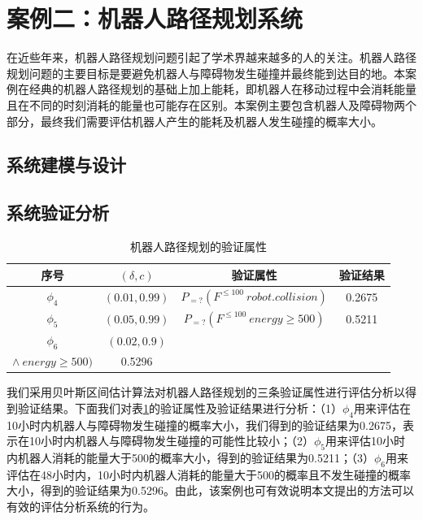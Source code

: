 \section{案例二：机器人路径规划系统}
在近些年来，机器人路径规划问题引起了学术界越来越多的人的关注。机器人路径规划问题的主要目标是要避免机器人与障碍物发生碰撞并最终能到达目的地。本案例在经典的机器人路径规划的基础上加上能耗，即机器人在移动过程中会消耗能量且在不同的时刻消耗的能量也可能存在区别。本案例主要包含机器人及障碍物两个部分，最终我们需要评估机器人产生的能耗及机器人发生碰撞的概率大小。
\subsection{系统建模与设计}

\subsection{系统验证分析}
\begin{table}[t]
	\caption{机器人路径规划的验证属性}
	\label{tb:robot}
	\centering
	\begin{tabular}{c c c c}
		\hline
		序号 & $(\delta,c)$ & 验证属性 & 验证结果 \\
		\hline
		$\phi_4$ & $(0.01,0.99)$ & $P_{=?}(F^{\leq100}~robot.collision)$ & 0.2675 \\ 
		$\phi_5$ & $(0.05,0.99)$ & $P_{=?}(F^{\leq100}~energy \geq 500)$ & 0.5211 \\
		$\phi_6$ & $(0.02,0.9)$ & 
		\tabincell{c}{$P_{=?}(F^{\leq100}~robot.collision$ \\ $\wedge~energy \geq 500)$} & 0.5296\\
		\hline
	\end{tabular}
\end{table}

我们采用贝叶斯区间估计算法对机器人路径规划的三条验证属性进行评估分析以得到验证结果。下面我们对表\ref{tb:robot}的验证属性及验证结果进行分析：（1）$\phi_4$用来评估在10小时内机器人与障碍物发生碰撞的概率大小，我们得到的验证结果为0.2675，表示在10小时内机器人与障碍物发生碰撞的可能性比较小；（2）$\phi_5$用来评估10小时内机器人消耗的能量大于500的概率大小，得到的验证结果为0.5211；（3）$\phi_6$用来评估在48小时内，10小时内机器人消耗的能量大于500的概率且不发生碰撞的概率大小，得到的验证结果为0.5296。由此，该案例也可有效说明本文提出的方法可以有效的评估分析系统的行为。

